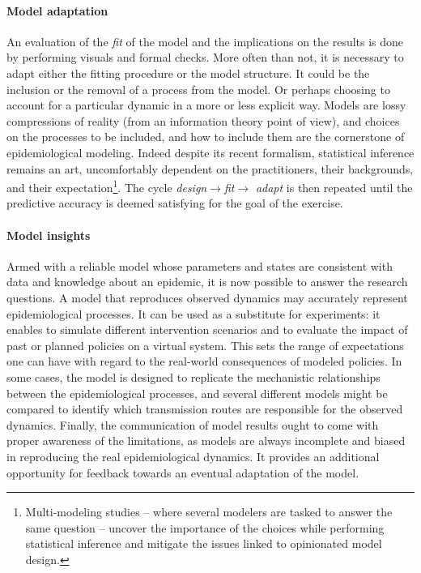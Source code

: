 \paragraph{Model adaptation} An evaluation of the \textit{fit} of the model and the implications on the results is done by performing visuals and formal checks. More often than not, it is necessary to adapt either the fitting procedure or the model structure. It could be the inclusion or the removal of a process from the model. Or perhaps choosing to account for a particular dynamic in a more or less explicit way. Models are lossy compressions of reality (from an information theory point of view), and choices on the processes to be included, and how to include them are the cornerstone of epidemiological modeling. Indeed despite its recent formalism, statistical inference remains an art, uncomfortably dependent on the practitioners, their backgrounds, and their expectation\footnote{Multi-modeling studies -- where several modelers are tasked to answer the same question -- uncover the importance of the choices while performing statistical inference and mitigate the issues linked to opinionated model design.}. The cycle \textit{design}$\rightarrow$\textit{fit}$\rightarrow$ \textit{adapt} is then repeated until the predictive accuracy is deemed satisfying for the goal of the exercise. 

\paragraph{Model insights}  Armed with a reliable model whose parameters and states are consistent with data and knowledge about an epidemic, it is now possible to answer the research questions. A model that reproduces observed dynamics may accurately represent epidemiological processes. It can be used as a substitute for experiments: it enables to simulate different intervention scenarios and to evaluate the impact of past or planned policies on a virtual system. This sets the range of expectations one can have with regard to the real-world consequences of modeled policies. In some cases, the model is designed to replicate the mechanistic relationships between the epidemiological processes, and several different models might be compared to identify which transmission routes are responsible for the observed dynamics.  Finally, the communication of model results ought to come with proper awareness of the limitations, as models are always incomplete and biased in reproducing the real epidemiological dynamics. It provides an additional opportunity for feedback towards an eventual adaptation of the model\cite{Heesterbeek:ModelingInfectiousDisease:2015}. 

